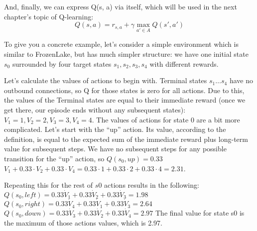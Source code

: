 And, finally, we can express Q(s, a) via itself, which will be used in the next chapter’s topic of Q-learning:
\begin{equation*}
Q(s,a)=r_{s,a} + \gamma \max_{a' \in A}Q(s',a')
\end{equation*}

To give you a concrete example, let’s consider a simple environment which is
similar to FrozenLake, but has much simpler structure: we have one initial state
\begin{math}s_0\end{math} surrounded by four target states \begin{math}s_1, s_2, s_3, s_4\end{math} with different rewards.

Let’s calculate the values of actions to begin with. Terminal states \begin{math}s_1 \ldots s_4\end{math} have no
outbound connections, so Q for those states is zero for all actions. Due to this, the
values of the Terminal states are equal to their immediate reward (once we get there,
our episode ends without any subsequent states): \begin{math}V_1 = 1, V_2 = 2, V_3 = 3, V_4 = 4\end{math}.
The values of actions for state 0 are a bit more complicated. Let’s start with the
“up” action. Its value, according to the definition, is equal to the expected sum
of the immediate reward plus long-term value for subsequent steps. We have no
subsequent steps for any possible transition for the “up” action, so \begin{math}Q(s_0, up) = 0.33\end{math}
\begin{math}V_1 + 0.33 \cdot V_2 + 0.33 \cdot V_4 = 0.33 \cdot 1 + 0.33 \cdot 2 + 0.33 \cdot 4 = 2.31\end{math}.

Repeating this for the rest of \begin{math}s0\end{math} actions results in the following:
\begin{math}Q(s_0, left) = 0.33 \dot V_1 + 0.33 \dot V_2 + 0.33 \dot V_3 = 1.98\end{math}
\begin{math}Q(s_0, right) = 0.33 \dot V_4 + 0.33 \dot V_1 + 0.33 \dot V_3 = 2.64\end{math}
\begin{math}Q(s_0, down) = 0.33 \dot V_3 + 0.33 \dot V_2 + 0.33 \dot V_4 = 2.97\end{math}
The final value for state s0 is the maximum of those actions\’ values, which is 2.97.

